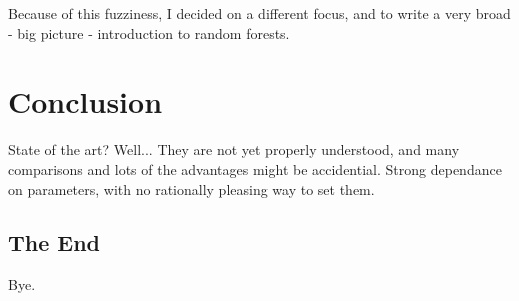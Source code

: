 \documentclass[a4paper,man,12pt,apacite]{apa6} %
\begin{document}
Because of this fuzziness, I decided on a different focus, and to write
a very broad - big picture - introduction to random forests.

\section{Conclusion}
State of the art? Well... They are not yet properly understood, and
many comparisons and lots of the advantages might be accidential.
Strong dependance on parameters, with no rationally pleasing way to set them.

\subsection{The End}
Bye.


\end{document}
